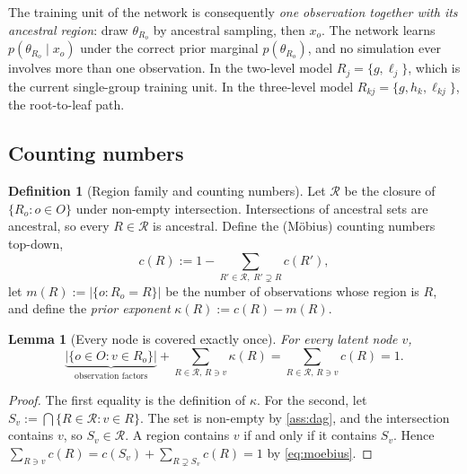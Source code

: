 \documentclass[11pt]{article}
\newtheorem{lemma}[theorem]{Lemma}
\theoremstyle{definition}
\newtheorem{definition}{Definition}
\theoremstyle{remark}
\newcommand{\Rset}{\mathcal{R}}
\begin{document}
The training unit of the network is consequently \emph{one observation together
with its ancestral region}: draw $\theta_{R_o}$ by ancestral sampling, then
$x_o$. The network learns $p(\theta_{R_o}\mid x_o)$ under the correct prior
marginal $p(\theta_{R_o})$, and no simulation ever involves more than one
observation. In the two-level model $R_j=\{g,\ell_j\}$, which is the current
single-group training unit. In the three-level model $R_{kj}=\{g,h_k,\ell_{kj}\}$,
the root-to-leaf path.

\subsection{Counting numbers}

\begin{definition}[Region family and counting numbers]\label{def:counting}
Let $\Rset$ be the closure of $\{R_o:o\in O\}$ under non-empty intersection.
Intersections of ancestral sets are ancestral, so every $R\in\Rset$ is ancestral.
Define the (Möbius) counting numbers top-down,
\begin{equation}\label{eq:moebius}
c(R):=1-\sum_{R'\in\Rset,\;R'\supsetneq R}c(R'),
\end{equation}
let $m(R):=|\{o:R_o=R\}|$ be the number of observations whose region is $R$, and
define the \emph{prior exponent} $\kappa(R):=c(R)-m(R)$.
\end{definition}

\begin{lemma}[Every node is covered exactly once]\label{lem:cover}
For every latent node $v$,
\begin{equation}\label{eq:cover}
\underbrace{|\{o\in O:v\in R_o\}|}_{\text{observation factors}}+\sum_{R\in\Rset,\,R\ni v}\kappa(R)=\sum_{R\in\Rset,\,R\ni v}c(R)=1.
\end{equation}
\end{lemma}
\begin{proof}
The first equality is the definition of $\kappa$. For the second, let
$S_v:=\bigcap\{R\in\Rset:v\in R\}$. The set is non-empty by
\cref{ass:dag}, and the intersection contains $v$, so $S_v\in\Rset$. A region
contains $v$ if and only if it contains $S_v$. Hence
$\sum_{R\ni v}c(R)=c(S_v)+\sum_{R\supsetneq S_v}c(R)=1$ by \eqref{eq:moebius}.
\end{proof}
\end{document}
